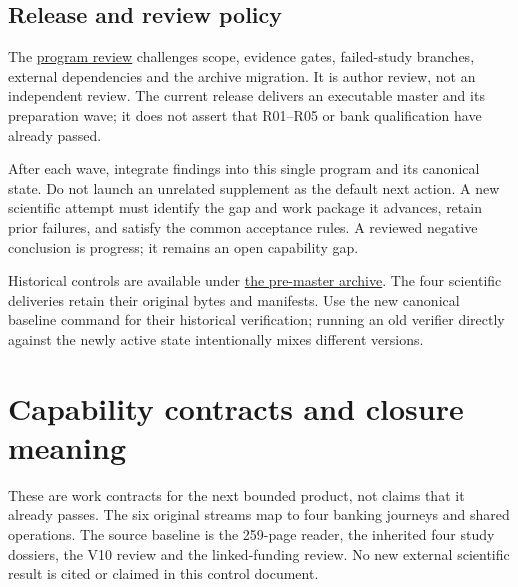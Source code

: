 \documentclass[
  11pt,
  a4paper,
]{article}
\begin{document}
\hypertarget{release-and-review-policy}{%
\subsection{Release and review policy}\label{release-and-review-policy}}

The \href{../reviews/master-program-review-2026-10-11.md}{program
review} challenges scope, evidence gates, failed-study branches,
external dependencies and the archive migration. It is author review,
not an independent review. The current release delivers an executable
master and its preparation wave; it does not assert that R01--R05 or
bank qualification have already passed.

After each wave, integrate findings into this single program and its
canonical state. Do not launch an unrelated supplement as the default
next action. A new scientific attempt must identify the gap and work
package it advances, retain prior failures, and satisfy the common
acceptance rules. A reviewed negative conclusion is progress; it remains
an open capability gap.

Historical controls are available under
\href{history/pre-master-2026-10-11/docs/program/master-program.md}{the
pre-master archive}. The four scientific deliveries retain their
original bytes and manifests. Use the new canonical baseline command for
their historical verification; running an old verifier directly against
the newly active state intentionally mixes different versions.

\hypertarget{capability-contracts-and-closure-meaning}{%
\section{Capability contracts and closure
meaning}\label{capability-contracts-and-closure-meaning}}

These are work contracts for the next bounded product, not claims that
it already passes. The six original streams map to four banking journeys
and shared operations. The source baseline is the 259-page reader, the
inherited four study dossiers, the V10 review and the linked-funding
review. No new external scientific result is cited or claimed in this
control document.
\end{document}
